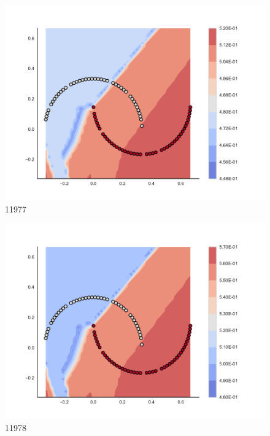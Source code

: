 \begin{subfigure}[b]{0.09\textwidth}
    \includegraphics[clip, trim=2.35cm 1.75cm 4.5cm 0cm,width=\textwidth]{img/convergence/11977.pdf}
    \caption{11977}
    \label{fig:convergence_11977}
\end{subfigure}
%
\begin{subfigure}[b]{0.09\textwidth}
    \includegraphics[clip, trim=2.35cm 1.75cm 4.5cm 0cm,width=\textwidth]{img/convergence/11978.pdf}
    \caption{11978}
    \label{fig:convergence_11978}
\end{subfigure}
%
